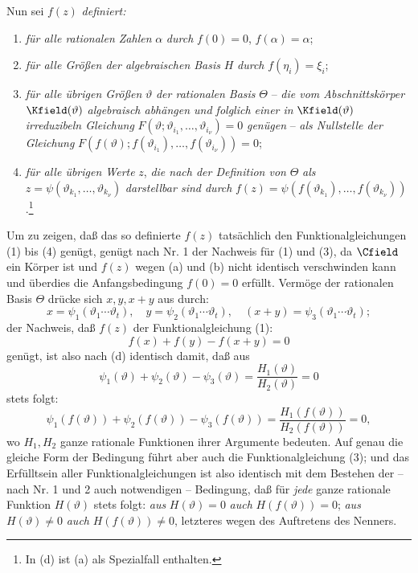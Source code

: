 \documentclass[11pt]{article}
\begin{document}
Nun sei \(f(z)\) \emph{definiert:}
\begin{enumerate}
\item[(a)] \emph{für alle rationalen Zahlen} \(\alpha\) \emph{durch} \(f(0)=0\), \(f(\alpha)=\alpha\);
\item[(b)] \emph{für alle Größen der algebraischen Basis} \(H\) \emph{durch} \(f(\eta_i)=\xi_i\);
\item[(c)] \emph{für alle übrigen Größen} \(\vartheta\) \emph{der rationalen Basis} \(\Theta\) -- \emph{die vom Abschnittskörper} \(\Kfield(\vartheta)\) \emph{algebraisch abhängen und folglich einer in} \(\Kfield(\vartheta)\) \emph{irreduzibeln Gleichung} \(F(\vartheta;\vartheta_{i_1},\ldots,\vartheta_{i_\nu})=0\) \emph{genügen} -- \emph{als Nullstelle der Gleichung} \(F(f(\vartheta);f(\vartheta_{i_1}),\ldots,f(\vartheta_{i_\nu}))=0\);
\item[(d)] \emph{für alle übrigen Werte} \(z\), \emph{die nach der Definition von} \(\Theta\) \emph{als} \(z=\psi(\vartheta_{k_1},\ldots,\vartheta_{k_\nu})\) \emph{darstellbar sind durch} \(f(z)=\psi(f(\vartheta_{k_1}),\ldots,f(\vartheta_{k_\nu}))\).\footnote{In (d) ist (a) als Spezialfall enthalten.}
\end{enumerate}
Um zu zeigen, daß das so definierte \(f(z)\) tatsächlich den Funktionalgleichungen (1) bis (4) genügt, genügt nach Nr. 1 der Nachweis für (1) und (3), da \(\Cfield\) ein Körper ist und \(f(z)\) wegen (a) und (b) nicht identisch verschwinden kann und überdies die Anfangsbedingung \(f(0)=0\) erfüllt. Vermöge der rationalen Basis \(\Theta\) drücke sich \(x,y,x+y\) aus durch:
\[
x=\psi_1(\vartheta_1\cdots\vartheta_t),\quad
 y=\psi_2(\vartheta_1\cdots\vartheta_t),\quad
 (x+y)=\psi_3(\vartheta_1\cdots\vartheta_t);
\]
der Nachweis, daß \(f(z)\) der Funktionalgleichung (1):
\[
f(x)+f(y)-f(x+y)=0
\]
genügt, ist also nach (d) identisch damit, daß aus
\[
\psi_1(\vartheta)+\psi_2(\vartheta)-\psi_3(\vartheta)
 =\frac{H_1(\vartheta)}{H_2(\vartheta)}=0
\]
stets folgt:
\[
\psi_1(f(\vartheta))+\psi_2(f(\vartheta))-\psi_3(f(\vartheta))
 =\frac{H_1(f(\vartheta))}{H_2(f(\vartheta))}=0,
\]
wo \(H_1,H_2\) ganze rationale Funktionen ihrer Argumente bedeuten. Auf genau die gleiche Form der Bedingung führt aber auch die Funktionalgleichung (3); und das Erfülltsein aller Funktionalgleichungen ist also identisch mit dem Bestehen der -- nach Nr. 1 und 2 auch notwendigen -- Bedingung, daß für \emph{jede} ganze rationale Funktion \(H(\vartheta)\) stets folgt: \emph{aus} \(H(\vartheta)=0\) \emph{auch} \(H(f(\vartheta))=0\); \emph{aus} \(H(\vartheta)\ne0\) \emph{auch} \(H(f(\vartheta))\ne0\), letzteres wegen des Auftretens des Nenners.
\end{document}
